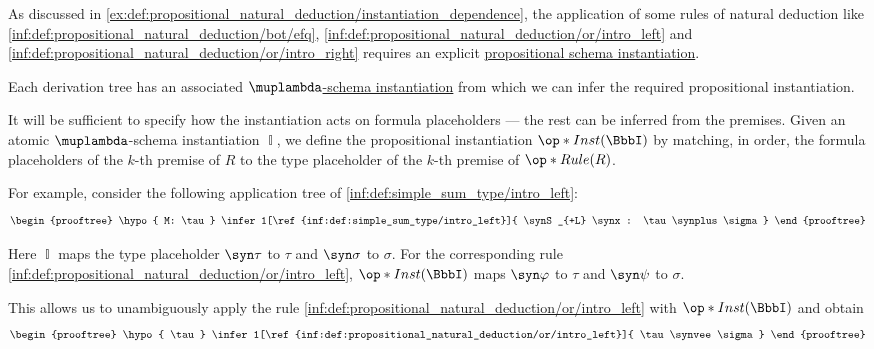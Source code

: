\begin{algorithm}
\begin{thmenum}
     As discussed in \cref{ex:def:propositional_natural_deduction/instantiation_dependence}, the application of some rules of natural deduction like \ref{inf:def:propositional_natural_deduction/bot/efq}, \ref{inf:def:propositional_natural_deduction/or/intro_left} and \ref{inf:def:propositional_natural_deduction/or/intro_right} requires an explicit \hyperref[alg:propositional_schema_instantiation]{propositional schema instantiation}.

    Each derivation tree has an associated \hyperref[def:atomic_lambda_instantiation]{\( \muplambda \)-schema instantiation} from which we can infer the required propositional instantiation.

    It will be sufficient to specify how the instantiation acts on formula placeholders --- the rest can be inferred from the premises. Given an atomic \( \muplambda \)-schema instantiation \( \BbbI \), we define the propositional instantiation \( \op*{Inst}(\BbbI) \) by matching, in order, the formula placeholders of the \( k \)-th premise of \( R \) to the type placeholder of the \( k \)-th premise of \( \op*{Rule}(R) \).

    For example, consider the following application tree of \ref{inf:def:simple_sum_type/intro_left}:
    \begin{equation*}
      \begin{prooftree}
        \hypo{ M: \tau }
        \infer1[\ref{inf:def:simple_sum_type/intro_left}]{ \synS_{+L} \synx: \tau \synplus \sigma }
      \end{prooftree}
    \end{equation*}

    Here \( \BbbI \) maps the type placeholder \( \syn\tau \) to \( \tau \) and \( \syn\sigma \) to \( \sigma \). For the corresponding rule \ref{inf:def:propositional_natural_deduction/or/intro_left}, \( \op*{Inst}(\BbbI) \) maps \( \syn\varphi \) to \( \tau \) and \( \syn\psi \) to \( \sigma \).

    This allows us to unambiguously apply the rule \ref{inf:def:propositional_natural_deduction/or/intro_left} with \( \op*{Inst}(\BbbI) \) and obtain
    \begin{equation*}
      \begin{prooftree}
        \hypo{ \tau }
        \infer1[\ref{inf:def:propositional_natural_deduction/or/intro_left}]{ \tau \synvee \sigma }
      \end{prooftree}
    \end{equation*}


\end{thmenum}
\end{algorithm}

